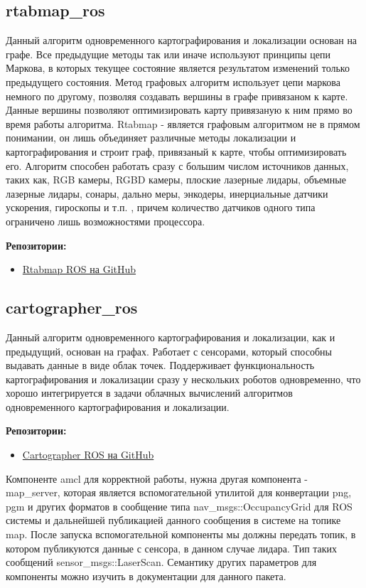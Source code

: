 \documentclass[a4paper, 14pt]{extreport}
\begin{document}
\subsection{rtabmap\_ros}
\par Данный алгоритм одновременного картографирования и локализации основан на графе\cite{rtabmapArt}. Все предыдущие методы так или иначе используют принципы
цепи Маркова, в которых текущее состояние является результатом изменений только предыдущего состояния. Метод графовых алгоритм использует 
цепи маркова немного по другому, позволяя создавать вершины в графе привязаном к карте. Данные вершины позволяют оптимизировать карту 
привязаную к ним прямо во время работы алгоритма. Rtabmap - является графовым алгоритмом не в прямом понимании, он лишь объединяет различные
методы локализации и картографирования и строит граф, привязаный к карте, чтобы оптимизировать его. Алгоритм способен работать сразу с 
большим числом источников данных, таких как, RGB камеры, RGBD камеры, плоские лазерные лидары, объемные лазерные лидары, сонары, дально
меры, энкодеры, инерциальные датчики ускорения, гироскопы и т.п. , причем количество датчиков одного типа ограничено лишь возможностями
процессора.
\par\noindent\textbf{Репозитории:}
\begin{itemize}
        \item \href{https://github.com/introlab/rtabmap_ros}{Rtabmap ROS на GitHub}
\end{itemize}
\subsection{cartographer\_ros}
\par Данный алгоритм одновременного картографирования и локализации, как и предыдущий, основан на графах\cite{cartographerArt}. Работает с сенсорами, который
способны выдавать данные в виде облак точек. Поддерживает функциональность картографирования и локализации сразу у нескольких роботов 
одновременно, что хорошо интегрируется в задачи облачных вычислений алгоритмов одновременного картографирования и локализации.
\par\noindent\textbf{Репозитории:}
\begin{itemize}
        \item \href{https://github.com/ros2/cartographer_ros}{Cartographer ROS на GitHub}
\end{itemize}
\par\noindent Компоненте amcl для корректной работы, нужна другая компонента - map\_server, которая является вспомогательной утилитой
для конвертации png, pgm и других форматов в сообщение типа nav\_msgs::OccupancyGrid для ROS системы и дальнейшей публикацией данного
сообщения в системе на топике map. После запуска вспомогательной компоненты мы должны передать топик, в котором публикуются данные с
сенсора, в данном случае лидара. Тип таких сообщений sensor\_msgs::LaserScan. Семантику других параметров для компоненты можно изучить
в документации для данного пакета.
\end{document}
